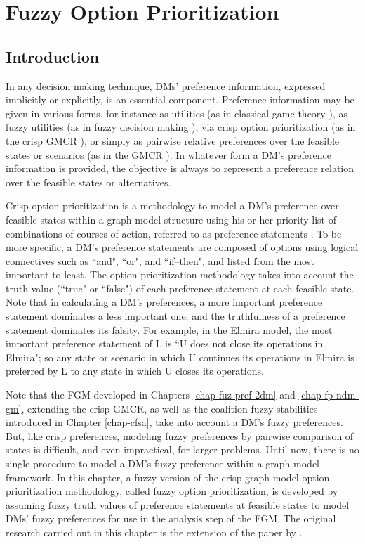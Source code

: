 \chapter{Fuzzy Option Prioritization}\label{chap-fop}

\section{Introduction}

In any decision making technique, DMs' preference information, expressed implicitly or explicitly, is an essential component. Preference information may be given in various forms, for instance as utilities (as in classical game theory \citep{VonNeumann&Morgenstern1944}), as fuzzy utilities (as in fuzzy decision making \citep{Nakamura1986, De-Wilde2004}), via crisp option prioritization (as in the crisp GMCR \citep{Hipel-et-al1997, Peng-et-al1997, Peng1999, Hipel-et-al2001, Fang-et-al2003}), or simply as pairwise relative preferences over the feasible states or scenarios (as in the GMCR \citep{Kilgour-et-al1987, Fang-et-al1993}). In whatever form a DM's preference information is provided, the objective is always to represent a preference relation over the feasible states or alternatives.

Crisp option prioritization is a methodology to model a DM's preference over feasible states within a graph model structure using his or her priority list of combinations of courses of action, referred to as preference statements \citep{Peng-et-al1997, Peng1999, Fang-et-al2003}. To be more specific, a DM's preference statements are composed of options using logical connectives such as ``and", ``or", and ``if--then", and listed from the most important to least. The option prioritization methodology takes into account the truth value (``true" or ``false") of each preference statement at each feasible state. Note that in calculating a DM's preferences, a more important preference statement dominates a less important one, and the truthfulness of a preference statement dominates its falsity. For example, in the Elmira model, the most important preference statement of L is ``U does not close its operations in Elmira"; so any state or scenario in which U continues its operations in Elmira is preferred by L to any state in which U closes its operations.

Note that the FGM developed in Chapters \ref{chap-fuz-pref-2dm} and \ref{chap-fp-ndm-gm}, extending the crisp GMCR, as well as the coalition fuzzy stabilities introduced in Chapter \ref{chap-cfsa}, take into account a DM's fuzzy preferences. But, like crisp preferences, modeling fuzzy preferences by pairwise comparison of states is difficult, and even impractical, for larger problems. Until now, there is no single procedure to model a DM's fuzzy preference within a graph model framework. In this chapter, a fuzzy version of the crisp graph model option prioritization methodology, called fuzzy option prioritization, is developed by assuming fuzzy truth values of preference statements at feasible states to model DMs' fuzzy preferences for use in the analysis step of the FGM. The original research carried out in this chapter is the extension of the paper by \citet{Bashar-et-al2012c}.

